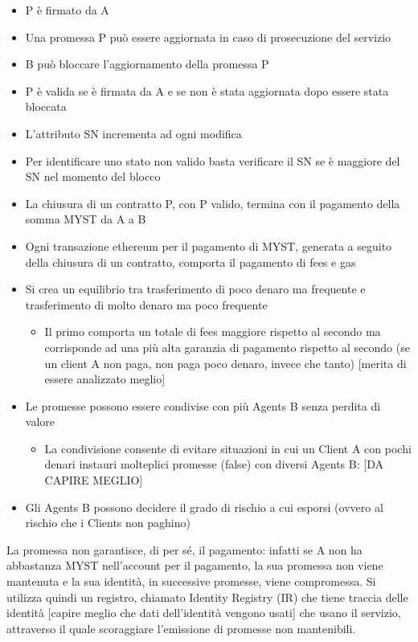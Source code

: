 \documentclass[]{article}
\begin{document}
	\begin{itemize}
		\item P è firmato da A
		\item Una promessa P può essere aggiornata in caso di prosecuzione del servizio
		\item B può bloccare l’aggiornamento della promessa P
		\item P è valida se è firmata da A e se non è stata aggiornata dopo essere stata bloccata
		\item L’attributo SN incrementa ad ogni modifica
		\item Per identificare uno stato non valido basta verificare il SN se è maggiore del SN nel momento del blocco
		\item La chiusura di un contratto P, con P valido, termina con il pagamento della somma MYST da A a B
		\item Ogni transazione ethereum per il pagamento di MYST, generata a seguito della chiusura di un contratto, comporta il pagamento di fees e gas
		\item Si crea un equilibrio tra trasferimento di poco denaro ma frequente e trasferimento di molto denaro ma poco frequente
		\begin{itemize}
			\item Il primo comporta un totale di fees maggiore rispetto al secondo ma corrisponde ad una più alta garanzia di pagamento rispetto al secondo (se un client A non paga, non paga poco denaro, invece che tanto) [merita di essere analizzato meglio]
		\end{itemize}
		\item Le promesse possono essere condivise con più Agents B senza perdita di valore
		\begin{itemize}
			\item La condivisione consente di evitare situazioni in cui un Client A con pochi denari instauri molteplici promesse (false) con diversi Agents B: [DA CAPIRE MEGLIO]
		\end{itemize}
		\item Gli Agents B possono decidere il grado di rischio a cui esporsi (ovvero al rischio che i Clients non paghino)
	\end{itemize}
	
	La promessa non garantisce, di per sé, il pagamento: infatti se A non ha abbastanza MYST nell'account per il pagamento, la sua promessa non viene mantenuta e la sua identità, in successive promesse, viene compromessa.
	Si utilizza quindi un registro, chiamato Identity Registry (IR) che tiene traccia delle identità [capire meglio che dati dell’identità vengono usati] che usano il servizio, attraverso il quale scoraggiare l’emissione di promesse non mantenibili.
	
	
	
	
\end{document}
